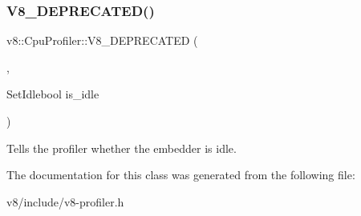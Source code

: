\subsubsection{\texorpdfstring{V8\+\_\+\+D\+E\+P\+R\+E\+C\+A\+T\+E\+D()}{V8\_DEPRECATED()}\hspace{0.1cm}{\footnotesize\ttfamily [2/2]}}
{\footnotesize\ttfamily v8\+::\+Cpu\+Profiler\+::\+V8\+\_\+\+D\+E\+P\+R\+E\+C\+A\+T\+ED (\begin{DoxyParamCaption}\item[{\char`\"{}Use \mbox{\hyperlink{classv8_1_1Isolate_a9b5a3d4caed212eabb58a2b0a54e7a5d}{Isolate\+::\+Set\+Idle}}(bool) instead.\char`\"{}}]{,  }\item[{void }]{Set\+Idlebool is\+\_\+idle }\end{DoxyParamCaption})}

Tells the profiler whether the embedder is idle. 

The documentation for this class was generated from the following file\+:\begin{DoxyCompactItemize}
\item 
v8/include/v8-\/profiler.\+h\end{DoxyCompactItemize}
